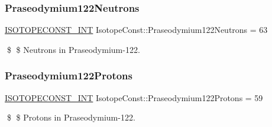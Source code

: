 \subsubsection{\texorpdfstring{Praseodymium122\+Neutrons}{Praseodymium122Neutrons}}
{\footnotesize\ttfamily \mbox{\hyperlink{group___isotope_const-_macros_ga5f18360b3e99483a35c32d789e62621c}{I\+S\+O\+T\+O\+P\+E\+C\+O\+N\+S\+T\+\_\+\+I\+NT}} Isotope\+Const\+::\+Praseodymium122\+Neutrons = 63}

\$ \$ Neutrons in Praseodymium-\/122. \mbox{\label{group___isotope_const-_praseodymium-_pr122_ga598e189ec137fff70520197938fc6e02}} 
\subsubsection{\texorpdfstring{Praseodymium122\+Protons}{Praseodymium122Protons}}
{\footnotesize\ttfamily \mbox{\hyperlink{group___isotope_const-_macros_ga5f18360b3e99483a35c32d789e62621c}{I\+S\+O\+T\+O\+P\+E\+C\+O\+N\+S\+T\+\_\+\+I\+NT}} Isotope\+Const\+::\+Praseodymium122\+Protons = 59}

\$ \$ Protons in Praseodymium-\/122. 